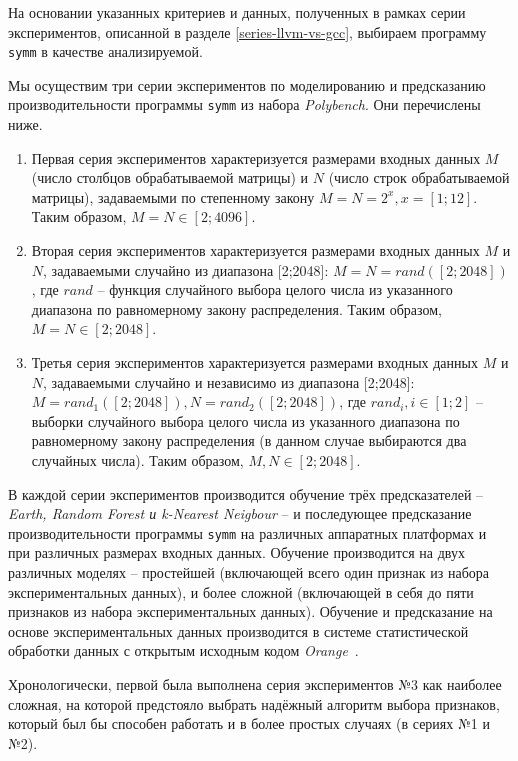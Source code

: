 На основании указанных критериев и данных, полученных в рамках серии экспериментов, описанной в разделе \ref{series-llvm-vs-gcc}, выбираем программу \texttt{symm} в качестве анализируемой.

Мы осуществим три серии экспериментов по моделированию и предсказанию производительности программы \texttt{symm} из набора \textit{Polybench}. Они перечислены ниже.
\begin{enumerate}
    \item Первая серия экспериментов характеризуется размерами входных данных $M$ (число столбцов обрабатываемой матрицы) и $N$ (число строк обрабатываемой матрицы), задаваемыми по степенному закону $M = N = 2^x, x = [1;12]$. Таким образом, $M = N \in [2;4096]$.
    \item Вторая серия экспериментов характеризуется размерами входных данных $M$ и $N$, задаваемыми случайно из диапазона [2;2048]: $M = N = rand([2;2048])$, где $rand$ -- функция случайного выбора целого числа из указанного диапазона по равномерному закону распределения. Таким образом, $M = N \in [2;2048]$.
    \item Третья серия экспериментов характеризуется размерами входных данных $M$ и $N$, задаваемыми случайно и независимо из диапазона [2;2048]: $M = rand_1([2;2048]), N = rand_2([2;2048])$, где $rand_i, i \in [1;2]$ -- выборки случайного выбора целого числа из указанного диапазона по равномерному закону распределения (в данном случае выбираются два случайных числа). Таким образом, $M, N \in [2;2048]$.
\end{enumerate}

В каждой серии экспериментов производится обучение трёх предсказателей -- \textit{Earth, Random Forest и k-Nearest Neigbour} -- и последующее предсказание производительности программы \texttt{symm} на различных аппаратных платформах и при различных размерах входных данных. Обучение производится на двух различных моделях -- простейшей (включающей всего один признак из набора экспериментальных данных), и более сложной (включающей в себя до пяти признаков из набора экспериментальных данных). Обучение и предсказание на основе экспериментальных данных производится в системе статистической обработки данных с открытым исходным кодом \textit{Orange}~\cite{orange}.

Хронологически, первой была выполнена серия экспериментов №3 как наиболее сложная, на которой предстояло выбрать надёжный алгоритм выбора признаков, который был бы способен работать и в более простых случаях (в сериях №1 и №2).

